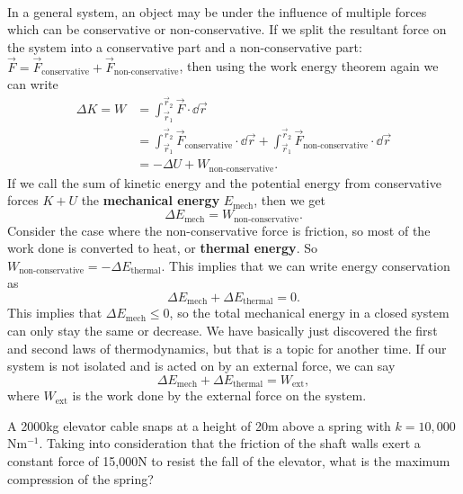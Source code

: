 \documentclass[../classical_mechanics.tex]{subfiles}
\begin{document}
        \paragraph{}
        In a general system, an object may be under the influence of multiple forces which can be conservative or non-conservative.
        If we split the resultant force on the system into a conservative part and a non-conservative part: $\vec{F}=\vec{F}_\text{conservative}+\vec{F}_\text{non-conservative}$, then using the work energy theorem again we can write
        \begin{align}
            \Delta K=W&=\int_{\vec{r}_1}^{\vec{r}_2}\vec{F}\cdot\dd{\vec{r}}\\
            &=\int_{\vec{r}_1}^{\vec{r}_2}\vec{F}_\text{conservative}\cdot\dd{\vec{r}}+\int_{\vec{r}_1}^{\vec{r}_2}\vec{F}_\text{non-conservative}\cdot\dd{\vec{r}}\\
            &=-\Delta U+W_\text{non-conservative}.
        \end{align}
        If we call the sum of kinetic energy and the potential energy from conservative forces $K+U$ the \textbf{mechanical energy} $E_\text{mech}$, then we get
        \begin{equation}
            \Delta E_\text{mech}=W_\text{non-conservative}.
        \end{equation}
        Consider the case where the non-conservative force is friction, so most of the work done is converted to heat, or \textbf{thermal energy}.
        So $W_\text{non-conservative}=-\Delta E_\text{thermal}$.
        This implies that we can write energy conservation as
        \begin{equation}
            \Delta E_\text{mech}+\Delta E_\text{thermal}=0.
        \end{equation}
        This implies that $\Delta E_\text{mech}\leq 0$, so the total mechanical energy in a closed system can only stay the same or decrease.
        We have basically just discovered the first and second laws of thermodynamics, but that is a topic for another time.
        If our system is not isolated and is acted on by an external force, we can say
        \begin{equation}
            \Delta E_\text{mech}+\Delta E_\text{thermal}=W_\text{ext},
        \end{equation}
        where $W_\text{ext}$ is the work done by the external force on the system.
        \begin{example}
            A 2000kg elevator cable snaps at a height of 20m above a spring with $k=10,000$Nm$^{-1}$.
            Taking into consideration that the friction of the shaft walls exert a constant force of 15,000N to resist the fall of the elevator, what is the maximum compression of the spring?
        \end{example}
\end{document}
